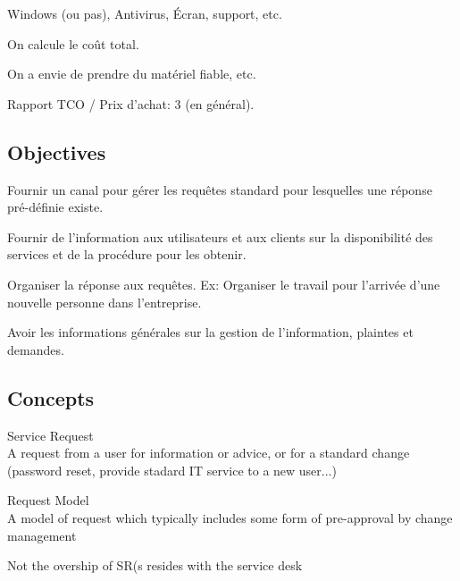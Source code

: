 \documentclass[a4paper,11pt]{article}
\begin{document}
Windows (ou pas), Antivirus, Écran, support, etc.

On calcule le coût total.

On a envie de prendre du matériel fiable, etc.

Rapport TCO / Prix d'achat: 3 (en général).

\subsection{Objectives}

Fournir un canal pour gérer les requêtes standard pour lesquelles une réponse
pré-définie existe.

Fournir de l'information aux utilisateurs et aux clients sur la disponibilité
des services et de la procédure pour les obtenir.

Organiser la réponse aux requêtes. Ex: Organiser le travail pour l'arrivée d'une
nouvelle personne dans l'entreprise.

Avoir les informations générales sur la gestion de l'information, plaintes et
demandes.

\subsection{Concepts}

Service Request\\
A request from a user for information or advice, or for a standard change
(password reset, provide stadard IT service to a new user...)

Request Model \\
A model of request which typically includes some form of pre-approval by change
management

Not the overship of SR(s resides with the service desk
\end{document}
